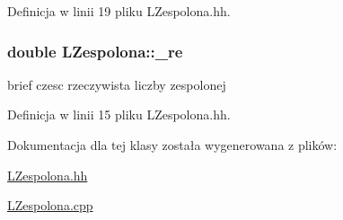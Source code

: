 Definicja w linii 19 pliku LZespolona.hh.

\hypertarget{class_l_zespolona_a2c047555071a543fbe6a25e7ccb949c8}{
\subsubsection[{\_\-re}]{\setlength{\rightskip}{0pt plus 5cm}double {\bf LZespolona::\_\-re}}}
\label{class_l_zespolona_a2c047555071a543fbe6a25e7ccb949c8}
brief czesc rzeczywista liczby zespolonej 

Definicja w linii 15 pliku LZespolona.hh.



Dokumentacja dla tej klasy została wygenerowana z plików:\begin{DoxyCompactItemize}
\item 
\hyperlink{_l_zespolona_8hh}{LZespolona.hh}\item 
\hyperlink{_l_zespolona_8cpp}{LZespolona.cpp}\end{DoxyCompactItemize}

